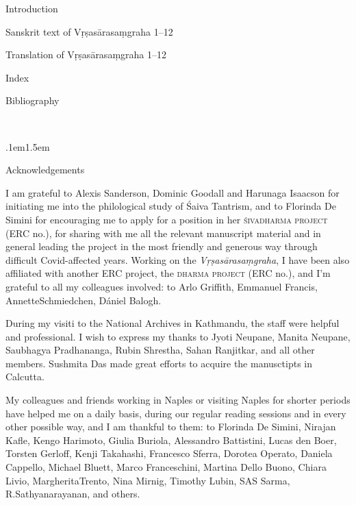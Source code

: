 \documentclass[12pt]{book}
\begin{document}
Introduction \dotfill\  \pageref{introduction}

Sanskrit text of Vṛṣasārasaṃgraha 1--12 \dotfill \pageref{skt-text}

Translation of Vṛṣasārasaṃgraha 1--12  \dotfill \pageref{translation}

Index \dotfill \pageref{index}

Bibliography \dotfill \pageref{bibliography}


\vfill
\pagebreak
\thispagestyle{empty}
\ 
\pagebreak


\thispagestyle{empty}
\parskip.1em\parindent1.5em
\ \vskip4cm

\begin{center}
{\Large 
			Acknowledgements%
}\end{center}
\label{acknowledgements}
\vskip1cm

\noindent
I am grateful to Alexis Sanderson, Dominic Goodall and 
Harunaga Isaacson for initiating me into the philological 
study of Śaiva Tantrism, and to Florinda De Simini for
encouraging me to apply for a position in her 
\textsc{\hbox{śivadharma} project} (ERC no.),
for sharing with me all the relevant manuscript material and
in general leading the project in the most friendly and 
generous way through difficult Covid-affected years.  
Working on the \textsl{Vṛṣa\-sāra\-saṃgraha}, 
I have been also affiliated with another ERC project, 
the \textsc{dharma project} (ERC no.), 
and I'm grateful to all my colleagues involved: to
Arlo Griffith, Emmanuel Francis, Annette\linebreak Schmiedchen, 
Dániel Balogh.

During my visiti to the National Archives in Kathmandu,
the staff were helpful and professional. I wish to express my
thanks to Jyoti Neupane, Manita Neupane, Saubhagya
Pradhananga, Rubin Shrestha, Sahan Ranjitkar, and all %
other members. Sushmita Das made great efforts to
acquire the manusctipts in Calcutta.

My colleagues and friends working in Naples or visiting Naples 
for shorter periods have helped me on a daily
basis, during our regular reading sessions and in every other possible
way, and I am thankful to them: to Florinda De Simini, Nirajan Kafle,
Kengo Harimoto, Giulia Buriola, Alessandro Battistini, Lucas den Boer,
Torsten Gerloff, Kenji Takahashi, Francesco Sferra, Dorotea Operato,
Daniela Cappello, Michael Bluett,\linebreak
Marco Franceschini, Martina Dello Buono, Chiara Livio, Margherita\linebreak Trento, Nina Mirnig, Timothy Lubin,
SAS Sarma, R.\thinspace Sathyanarayanan, and others.
\end{document}
